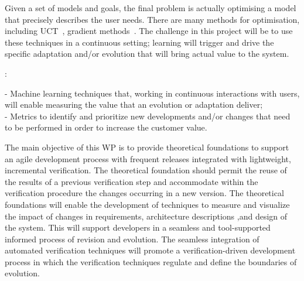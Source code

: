 \documentclass[12pt]{article}
\begin{document}
Given a set
of models and goals, the final problem is actually optimising a model that precisely describes the user needs. There are many
methods for optimisation, including
UCT~\cite{ECML:Kocsis+Szepesvari:2006}, gradient
methods~\cite{dimitrakakis:gbrl,ghavamzadeh:bpga,knowgrad}. The challenge in this project will be to use these techniques in a continuous setting; learning will trigger and drive the specific adaptation and/or evolution that will bring actual value to the system.

:
 
 - Machine learning techniques that, working in continuous interactions with users, will enable measuring the value that an evolution or adaptation deliver;\\ 
 - Metrics to identify and prioritize new developments and/or changes that need to be performed in order to increase the customer value.

\vspace{.2cm}

\noindent The main objective of this WP is to provide theoretical foundations to %
support an agile development process with frequent releases integrated with lightweight, incremental verification.  The theoretical foundation should permit the %
reuse %
of the results of a previous verification step and accommodate within the verification procedure the changes  occurring in a new version.
The theoretical foundations %
will enable the development of techniques to measure and visualize the impact of changes in 
 requirements,  architecture descriptions ,and design of the system. This will support developers in a seamless and tool-supported informed process of revision and evolution.
The seamless integration of automated verification techniques will promote a verification-driven development process in which the verification techniques regulate and define the boundaries of evolution. 
\end{document}
